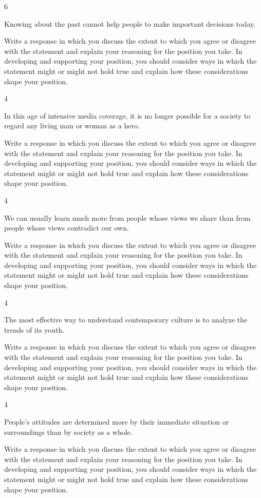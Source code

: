 \documentclass[]{article}
\begin{document}
6

Knowing about the past cannot help people to make important decisions
today.

Write a response in which you discuss the extent to which you agree or
disagree with the statement and explain your reasoning for the position
you take. In developing and supporting your position, you should
consider ways in which the statement might or might not hold true and
explain how these considerations shape your position.

4

In this age of intensive media coverage, it is no longer possible for a
society to regard any living man or woman as a hero.

Write a response in which you discuss the extent to which you agree or
disagree with the statement and explain your reasoning for the position
you take. In developing and supporting your position, you should
consider ways in which the statement might or might not hold true and
explain how these considerations shape your position.

4

We can usually learn much more from people whose views we share than
from people whose views contradict our own.

Write a response in which you discuss the extent to which you agree or
disagree with the statement and explain your reasoning for the position
you take. In developing and supporting your position, you should
consider ways in which the statement might or might not hold true and
explain how these considerations shape your position.

4

The most effective way to understand contemporary culture is to analyze
the trends of its youth.

Write a response in which you discuss the extent to which you agree or
disagree with the statement and explain your reasoning for the position
you take. In developing and supporting your position, you should
consider ways in which the statement might or might not hold true and
explain how these considerations shape your position.

4

People's attitudes are determined more by their immediate situation or
surroundings than by society as a whole.

Write a response in which you discuss the extent to which you agree or
disagree with the statement and explain your reasoning for the position
you take. In developing and supporting your position, you should
consider ways in which the statement might or might not hold true and
explain how these considerations shape your position.
\end{document}
